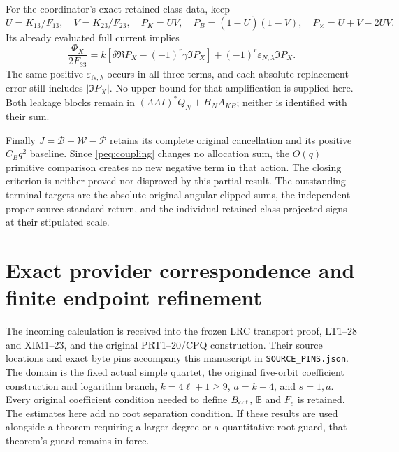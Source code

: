 \documentclass[11pt,a4paper]{article}
\begin{document}
For the coordinator's exact retained-class data, keep
\[
 U=K_{13}/F_{13},\quad V=K_{23}/F_{23},\quad
 P_K=\bar UV,\quad P_B=(1-\bar U)(1-V),\quad
 P_\times=\bar U+V-2\bar UV.
\]
Its already evaluated full current implies
\[
 \frac{\Phi_X}{2F_{33}}
 =k[\delta\Re P_X-(-1)^r\gamma\Im P_X]
       +(-1)^r\varepsilon_{N,\lambda}\Im P_X.
\]
The same positive $\varepsilon_{N,\lambda}$ occurs in all three terms, and each absolute replacement error still includes $|\Im P_X|$. No upper bound for that amplification is supplied here. Both leakage blocks remain in
$(\Lambda AI)^*Q_N+H_NA_{KB}$; neither is identified with their sum.

Finally $J=\mathcal B+\mathcal W-\mathcal P$ retains its complete original cancellation and its positive $C_Bq^2$ baseline. Since \eqref{peq:coupling} changes no allocation sum, the $O(q)$ primitive comparison creates no new negative term in that action. The closing criterion is neither proved nor disproved by this partial result. The outstanding terminal targets are the absolute original angular clipped sums, the independent proper-source standard return, and the individual retained-class projected signs at their stipulated scale.

\section{Exact provider correspondence and finite endpoint refinement}
\label{peq:intake}

The incoming calculation is received into the frozen LRC transport
proof, LT1--28 and XIM1--23, and the original PRT1--20/CPQ
construction. Their source locations and exact byte pins accompany this
manuscript in \texttt{SOURCE\_PINS.json}. The domain is the fixed actual
simple quartet, the original five-orbit coefficient construction and
logarithm branch, $k=4\ell+1\ge9$, $a=k+4$, and $s=1,a$.
Every original coefficient condition needed to define $B_{\rm cof}$,
$\mathbb B$ and $F_e$ is retained. The estimates here add no root
separation condition. If these results are used alongside a theorem
requiring a larger degree or a quantitative root guard, that theorem's
guard remains in force.
\end{document}
